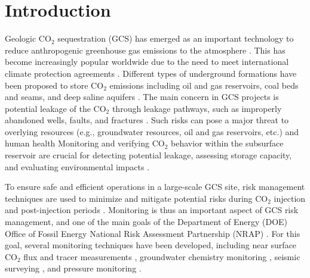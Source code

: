 \documentclass[a4paper,fleqn]{cas-sc}
\begin{document}
\section{Introduction}
Geologic CO$_2$ sequestration (GCS) has emerged as an important technology to reduce anthropogenic greenhouse gas emissions to the atmosphere \citep{Metz2005,Michael2010,Kopp2010867, Goodman2013329, Castelletto2013570, Li2015389, Levine201681, krevorCCS2018}. This has become increasingly popular worldwide due to the need to meet international climate protection agreements \citep{Energy20202010EuropeanCommission, Unitednations2015AgreementP}. Different types of underground formations have been proposed to store CO$_2$ emissions including oil and gas reservoirs, coal beds and seams, and deep saline aquifers \citep{Dai2016CO2Sites}. The main concern in GCS projects is potential leakage of the CO$_2$ through leakage pathways, such as improperly abandoned wells, faults, and fractures \citep{Metz2005, Harp2016150, Song2012, Sifuentes2009148, Nordbotten2012234}. Such risks can pose a major threat to overlying resources (e.g., groundwater resources, oil and gas reservoirs, etc.) and human health \citep{Benson2003, Keating2016319} Monitoring and verifying CO$_2$ behavior within the subsurface reservoir are crucial for detecting potential leakage, assessing storage capacity, and evaluating environmental impacts \citep{Condor20114036, DeLary201550, Li2016249}.

To ensure safe and efficient operations in a large-scale GCS site, risk management techniques are used to minimize and mitigate potential risks during CO$_2$ injection and post-injection periods \citep{Nicot2013388, Onishi201944, Dai20143908, Zhang20111631, Chadwick20051385}. Monitoring is thus an important aspect of GCS risk management, and one of the main goals of the Department of Energy (DOE) Office of Fossil Energy National Risk Assessment Partnership (NRAP) \citep{Pawar2016175}. For this goal, several monitoring techniques have been developed, including near surface CO$_2$ flux and tracer measurements \citep{Yang2012185, Ren2016108}, groundwater chemistry monitoring \citep{Dai2014, Yang20158887}, seismic surveying \citep{Ren2016108, Zhang20151, Chadwick2006303, Grana2017296}, and pressure monitoring \citep{Keating20144163, Wang2014188, Azzolina2014895, Oruganti20114140, Senel20134598}. 
\end{document}
